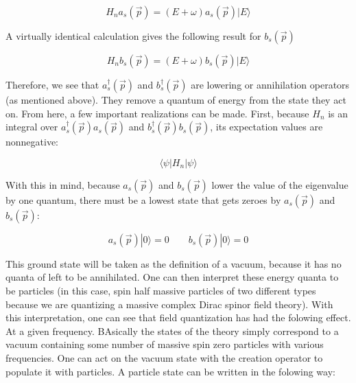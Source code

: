 \documentclass[a4]{article}
\begin{document}
    \begin{framed}
        \begin{equation}
            H_n a_s (\vec{p}) = (E + \omega) a_s (\vec{p}) | E \rangle
        \end{equation}
    \end{framed}

    A virtually identical calculation gives the following result for $b_s (\vec{p})$

    \begin{framed}
        \begin{equation}
            H_n b_s (\vec{p}) = (E + \omega) b_s (\vec{p}) | E \rangle
        \end{equation}
    \end{framed}

    Therefore, we see that $a_s^{\dagger} (\vec{p})$ and $b_s^{\dagger} (\vec{p})$ are lowering or annihilation operators (as mentioned above). They remove a quantum of energy from the state
    they act on. From here, a few important realizations can be made. First, because $H_n$ is an integral over $a_s^{\dagger} (\vec{p}) a_s (\vec{p})$ and $b_s^{\dagger} (\vec{p}) b_s (\vec{p})$,
    its expectation values are nonnegative:

    \begin{equation}
        \langle \psi | H_n | \psi \rangle
    \end{equation}

    With this in mind, because $a_s (\vec{p})$ and $b_s (\vec{p})$ lower the value of the eigenvalue by one quantum, there must be a lowest state that gets zeroes by $a_s (\vec{p})$ and $b_s (\vec{p})$:

    \begin{equation}
        a_s (\vec{p}) | 0 \rangle = 0 \qquad b_s (\vec{p}) | 0 \rangle = 0
    \end{equation}

    This ground state will be taken as the definition of a vacuum, because it has no quanta of left to be annihilated. One can then interpret these energy quanta to be particles (in this case, spin half
    massive particles of two different types because we are quantizing a massive complex Dirac spinor field theory). With this interpretation, one can see that field quantization has had the folowing
    effect. At a given frequency. BAsically the states of the theory simply correspond to a vacuum containing some number of massive spin zero particles with various frequencies. One can act on the vacuum
    state with the creation operator to populate it with particles. A particle state can be written in the folowing way:
\end{document}
